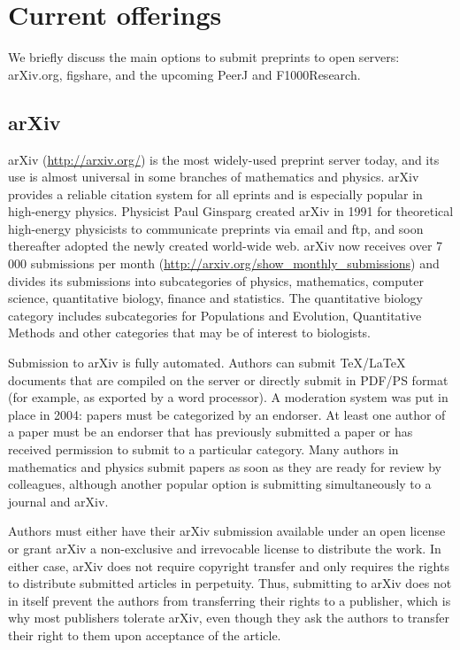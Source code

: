 \documentclass[letterpaper,twocolumn,superscriptaddress,showkeys,longbibliography]{revtex4-1}
\begin{document}
\section{Current offerings}

We briefly discuss the main options to submit preprints to open servers:
arXiv.org, figshare, and the upcoming PeerJ and F1000Research.

\subsection{arXiv}

arXiv (\url{http://arxiv.org/}) is the most widely-used preprint server today,
and its use is almost universal in some branches of mathematics and physics.
arXiv provides a reliable citation system for all eprints and is especially
popular in high-energy physics. Physicist Paul Ginsparg created arXiv in 1991
for theoretical high-energy physicists to communicate preprints via email and
ftp, and soon thereafter adopted the newly created world-wide
web\cite{jackson2002preprints}.  arXiv now receives over 7 000 submissions per
month (\url{http://arxiv.org/show_monthly_submissions}) and divides its
submissions into subcategories of physics, mathematics, computer science,
quantitative biology, finance and statistics.  The quantitative biology category
includes subcategories for Populations and Evolution, Quantitative Methods and
other categories that may be of interest to biologists.

Submission to arXiv is fully automated.  Authors can submit \TeX{}/\LaTeX{}
documents that are compiled on the server or directly submit in PDF/PS format
(for example, as exported by a word processor).  A moderation system was put in
place in 2004: papers must be categorized by an endorser. At least one author of
a paper must be an endorser that has previously submitted a paper or has
received permission to submit to a particular category.  Many authors in
mathematics and physics submit papers as soon as they are ready for review by
colleagues, although another popular option is submitting simultaneously to a
journal and arXiv.

Authors must either have their arXiv submission available under an open license
or grant arXiv a non-exclusive and irrevocable license to distribute the work.
In either case, arXiv does not require copyright transfer and only requires the
rights to distribute submitted articles in perpetuity. Thus, submitting to arXiv
does not in itself prevent the authors from transferring their rights to a
publisher, which is why most publishers tolerate arXiv, even though they ask the
authors to transfer their right to them upon acceptance of the article.
\end{document}
